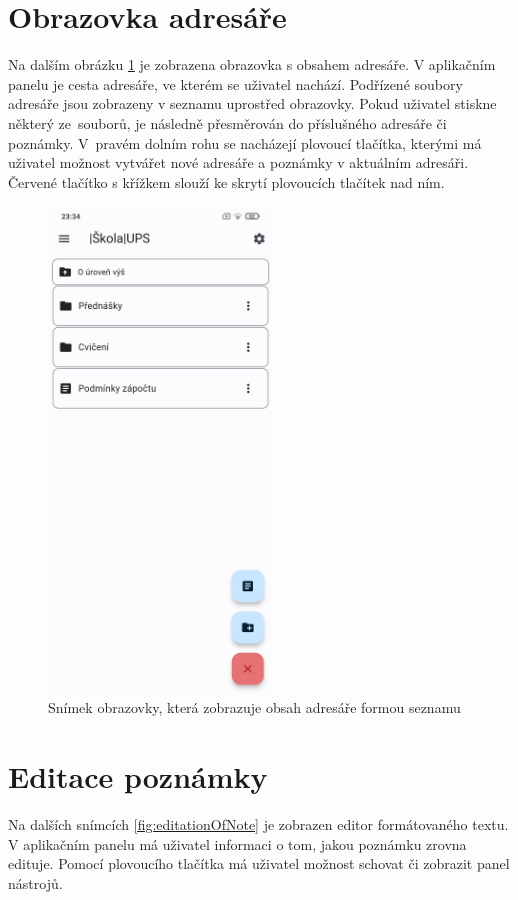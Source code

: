 \documentclass[czech, bc, kiv, he, iso690numb]{fasthesis}
\begin{document}
\section{Obrazovka adresáře} \label{manual:listView}

Na dalším obrázku \ref{fig:FolderScreen} je zobrazena obrazovka s obsahem adresáře. V aplikačním panelu je cesta adresáře, ve kterém se uživatel nachází. Podřízené soubory adresáře jsou zobrazeny v seznamu uprostřed obrazovky. Pokud uživatel stiskne některý ze~souborů, je následně přesměrován do příslušného adresáře či poznámky. V~pravém dolním rohu se nacházejí plovoucí tlačítka, kterými má uživatel možnost vytvářet nové adresáře a poznámky v aktuálním adresáři. Červené tlačítko s křížkem slouží ke skrytí plovoucích tlačítek nad ním. 

\begin{figure}[h!]
  \centering
  \includegraphics[width=0.53\textwidth]{img/BP-Runt/UserManual/Folder.jpg}
  \caption{Snímek obrazovky, která zobrazuje obsah adresáře formou seznamu}
  \label{fig:FolderScreen}
\end{figure}

\section{Editace poznámky} \label{manual:note}
Na dalších snímcích \ref{fig:editationOfNote} je zobrazen editor formátovaného textu. V aplikačním panelu má uživatel informaci o tom, jakou poznámku zrovna edituje. Pomocí plovoucího tlačítka má uživatel možnost schovat či zobrazit panel nástrojů.  
\end{document}
